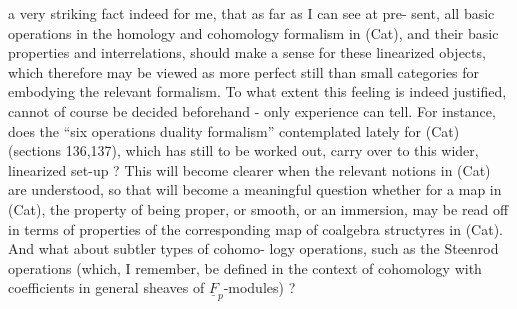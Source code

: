 
a very striking fact indeed for me, that as far as I can see at pre-%
sent, all basic operations in the  homology and cohomology formalism
in (Cat), and their basic properties and interrelations, should make
a sense for these linearized objects, which therefore may be viewed
as more perfect   still than small categories for embodying the
relevant formalism. To what extent this feeling is indeed justified,
cannot of course be decided beforehand - only experience can tell.
For instance, does the ``six operations duality formalism'' contemplated
lately for (Cat) (sections 136,137), which has still to be worked
out, carry over to this wider, linearized  set-up ? This
will become clearer when the relevant notions in (Cat) are understood,
so that  will become a meaningful question whether  for a map
in (Cat), the property of being proper, or smooth, or an immersion,
may be read off in terms of properties of the corresponding map of
coalgebra structyres\deleted{\unsure{,}} in (Cat). And what about subtler types of cohomo-%
logy operations, such as the Steenrod operations (which, I remember,
 be defined in the context of cohomology with coefficients in
general sheaves of $\underline{F}_p$-modules) ?

